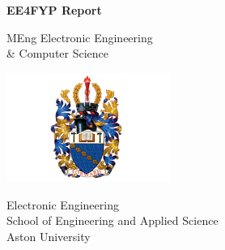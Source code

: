 %
%
%
\begin{titlepage}
  \begin{center}
    \vspace*{1cm}

    \Huge
    \textbf{EE4FYP Report}

    \vspace{0.5cm}
    \LARGE
    \@title

    \vspace{1.5cm}

    \textbf{\@author}

    \vfill

    MEng Electronic Engineering\\
    \& Computer Science

    \vspace{0.8cm}

    \includegraphics[width=0.4\textwidth]{assets/aston.jpeg}

    \Large
    Electronic Engineering\\
    School of Engineering and Applied Science\\
    Aston University\\
    \@date

  \end{center}
\end{titlepage}
